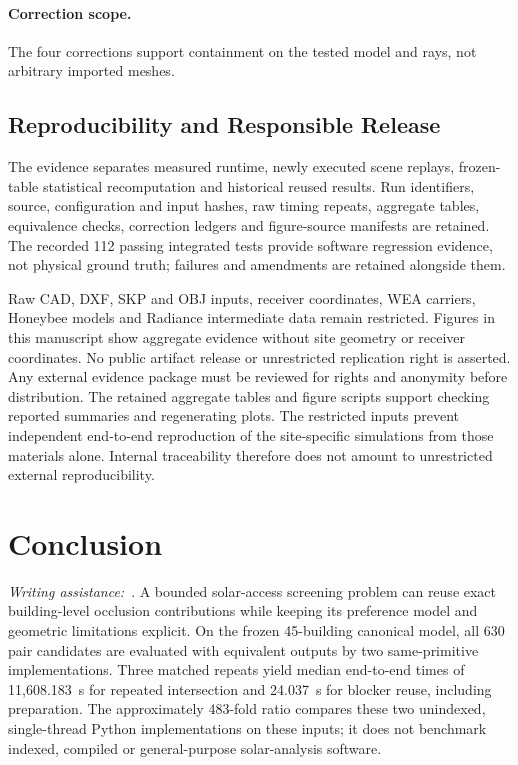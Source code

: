 \documentclass{llncs}
\newcommand{\aidraft}{\textit{Writing assistance:}~\cite{openai2026}. }
\begin{document}
\paragraph{Correction scope.} The four corrections support containment on the tested model and rays, not arbitrary imported meshes. 

\subsection{Reproducibility and Responsible Release}
The evidence separates measured runtime, newly executed scene replays, frozen-table statistical recomputation and historical reused results. Run identifiers, source, configuration and input hashes, raw timing repeats, aggregate tables, equivalence checks, correction ledgers and figure-source manifests are retained. The recorded 112 passing integrated tests provide software regression evidence, not physical ground truth; failures and amendments are retained alongside them.

Raw CAD, DXF, SKP and OBJ inputs, receiver coordinates, WEA carriers, Honeybee models and Radiance intermediate data remain restricted. Figures in this manuscript show aggregate evidence without site geometry or receiver coordinates. No public artifact release or unrestricted replication right is asserted. Any external evidence package must be reviewed for rights and anonymity before distribution. The retained aggregate tables and figure scripts support checking reported summaries and regenerating plots. The restricted inputs prevent independent end-to-end reproduction of the site-specific simulations from those materials alone. Internal traceability therefore does not amount to unrestricted external reproducibility.

\section{Conclusion}
\aidraft{}A bounded solar-access screening problem can reuse exact building-level occlusion contributions while keeping its preference model and geometric limitations explicit. On the frozen 45-building canonical model, all 630 pair candidates are evaluated with equivalent outputs by two same-primitive implementations. Three matched repeats yield median end-to-end times of 11,608.183~s for repeated intersection and 24.037~s for blocker reuse, including preparation. The approximately 483-fold ratio compares these two unindexed, single-thread Python implementations on these inputs; it does not benchmark indexed, compiled or general-purpose solar-analysis software.
\end{document}

